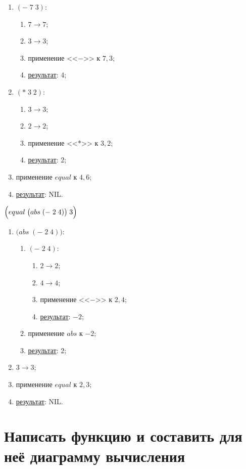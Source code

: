 \begin{enumerate}
	\item $(-\; 7\; 3)$:
	\begin{enumerate}
		\item $7 \to 7$;
		\item $3 \to 3$;
		\item применение <<$-$>> к $7, 3$;
		\item \underline{результат}: $4$;
	\end{enumerate}
	\item $(*\; 3\; 2)$:
	\begin{enumerate}
		\item $3 \to 3$;
		\item $2 \to 2$;
		\item применение <<$*$>> к $3, 2$;
		\item \underline{результат}: $2$;
	\end{enumerate}
	\item применение $equal$ к $4, 6$;
	\item \underline{результат}: NIL.
\end{enumerate}


\problem $\Bigl(equal\; \bigl(abs\; (-\; 2\; 4)\bigr)\; 3\Bigr)$

\begin{enumerate}
	\item $\bigl(abs\; (-\; 2\; 4)\bigr)$:
	\begin{enumerate}
		\item $(-\; 2\; 4)$:
		\begin{enumerate}
			\item $2 \to 2$;
			\item $4 \to 4$;
			\item применение <<$-$>> к $2, 4$;
			\item \underline{результат}: $-2$;
		\end{enumerate}
		\item применение $abs$ к $-2$;
		\item \underline{результат}: $2$;
	\end{enumerate}
	\item $3 \to 3$;
	\item применение $equal$ к $2, 3$;
	\item \underline{результат}: NIL.
\end{enumerate}
\vfill



\section{Написать функцию и составить для неё диаграмму вычисления}


